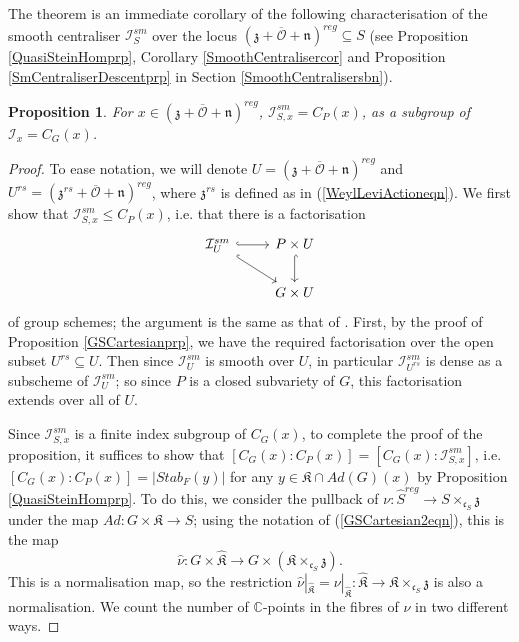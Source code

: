 \documentclass{amsart}
\newtheorem{proposition}[theorem]{Proposition}
\theoremstyle{remark}
\numberwithin{theorem}{section}
\numberwithin{equation}{section}
\begin{document}
The theorem is an immediate corollary of the following characterisation of the smooth centraliser $\mathcal I_S^{sm}$ over the locus $(\mathfrak{z} +\overline{\mathcal O} +\mathfrak{n})^{reg} \subseteq S$ (see Proposition \ref{QuasiSteinHomprp}, Corollary \ref{SmoothCentralisercor} and Proposition \ref{SmCentraliserDescentprp} in Section \ref{SmoothCentralisersbn}).

\begin{proposition}\label{ParabolicCentraliserprp}
    For $x \in (\mathfrak{z} +\overline{\mathcal O} +\mathfrak{n})^{reg}$, $\mathcal I_{S,x}^{sm} = C_P(x)$, as a subgroup of $\mathcal I_x = C_G(x)$.
\end{proposition}

\begin{proof} 
To ease notation, we will denote $U = (\mathfrak{z} +\overline{\mathcal O} +\mathfrak{n})^{reg}$ and $U^{rs} = (\mathfrak{z}^{rs} +\overline{\mathcal O} +\mathfrak{n})^{reg}$, where $\mathfrak{z}^{rs}$ is defined as in (\ref{WeylLeviActioneqn}). We first show that $\mathcal I_{S,x}^{sm} \leq C_P(x)$, i.e. that there is a factorisation
\begin{equation}\label{ParabolicCentraliser1eqn}
  \begin{tikzcd}
\mathcal I^{sm}_{U} \arrow[r, hook] \arrow[rd, hook] & P\times U \arrow[d, hook] \\
& G\times U                
\end{tikzcd}
\end{equation}
of group schemes; the argument is the same as that of \cite[Lemme 2.4.3]{Ngo2}. First, by the proof of Proposition \ref{GSCartesianprp}, we have the required factorisation over the open subset $U^{rs} \subseteq U$. Then since $\mathcal I_{U}^{sm}$ is smooth over $U$, in particular $\mathcal I_{U^{rs}}^{sm}$ is dense as a subscheme of $\mathcal I_{U}^{sm}$; so since $P$ is a closed subvariety of $G$, this factorisation extends over all of $U$.

Since $\mathcal I_{S,x}^{sm}$ is a finite index subgroup of $C_G(x)$, to complete the proof of the proposition, it suffices to show that $[C_G(x):C_P(x)] = [C_G(x): \mathcal I_{S,x}^{sm}]$, i.e.  $[C_G(x):C_P(x)] = |Stab_F(y)|$ for any $y \in \mathfrak{K} \cap Ad(G)(x)$ by Proposition \ref{QuasiSteinHomprp}. To do this, we consider the pullback of $\nu:\hat{S}^{reg} \rightarrow S \times_{\mathfrak{c}_S} \mathfrak{z}$ under the map $Ad:G \times \mathfrak{K} \rightarrow S$; using the notation of (\ref{GSCartesian2eqn}), this is the map
\begin{equation}\label{ParabolicCentraliser2eqn}
    \hat{\nu}:G \times\hat{\mathfrak{K}} \rightarrow G \times (\mathfrak{K} \times_{\mathfrak{c}_S} \mathfrak{z}).
\end{equation}
This is a normalisation map, so the restriction $\hat{\nu}|_{\hat{\mathfrak{K}}} = \nu|_{\hat{\mathfrak{K}}}:\hat{\mathfrak{K}} \rightarrow \mathfrak{K} \times_{\mathfrak{c}_S} \mathfrak{z}$ is also a normalisation. We count the number of $\mathbb{C}$-points in the fibres of $\nu$ in two different ways. 


\end{proof}
\end{document}
